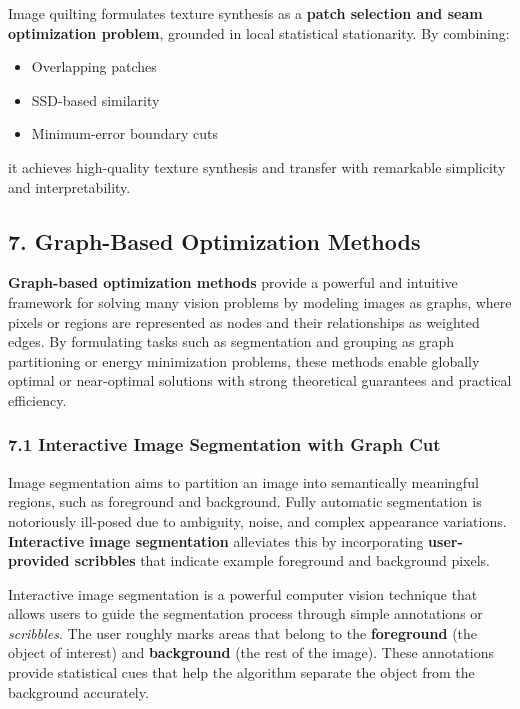 \documentclass[11pt]{article}
\providecommand{\tightlist}{%
      \setlength{\itemsep}{0pt}\setlength{\parskip}{0pt}}
\begin{document}
    Image quilting formulates texture synthesis as a \textbf{patch selection
and seam optimization problem}, grounded in local statistical
stationarity. By combining:

\begin{itemize}
\tightlist
\item
  Overlapping patches
\item
  SSD-based similarity
\item
  Minimum-error boundary cuts
\end{itemize}

it achieves high-quality texture synthesis and transfer with remarkable
simplicity and interpretability.

    \hypertarget{graph-based-optimization-methods}{%
\subsection{\texorpdfstring{\textbf{7. Graph-Based Optimization
Methods}}{7. Graph-Based Optimization Methods}}\label{graph-based-optimization-methods}}

\textbf{Graph-based optimization methods} provide a powerful and
intuitive framework for solving many vision problems by modeling images
as graphs, where pixels or regions are represented as nodes and their
relationships as weighted edges. By formulating tasks such as
segmentation and grouping as graph partitioning or energy minimization
problems, these methods enable globally optimal or near-optimal
solutions with strong theoretical guarantees and practical efficiency.

\hypertarget{interactive-image-segmentation-with-graph-cut}{%
\subsubsection{\texorpdfstring{\textbf{7.1 Interactive Image
Segmentation with Graph
Cut}}{7.1 Interactive Image Segmentation with Graph Cut}}\label{interactive-image-segmentation-with-graph-cut}}

Image segmentation aims to partition an image into semantically
meaningful regions, such as foreground and background. Fully automatic
segmentation is notoriously ill-posed due to ambiguity, noise, and
complex appearance variations. \textbf{Interactive image segmentation}
alleviates this by incorporating \textbf{user-provided scribbles} that
indicate example foreground and background pixels.

Interactive image segmentation is a powerful computer vision technique
that allows users to guide the segmentation process through simple
annotations or \emph{scribbles}. The user roughly marks areas that
belong to the \textbf{foreground} (the object of interest) and
\textbf{background} (the rest of the image). These annotations provide
statistical cues that help the algorithm separate the object from the
background accurately.
\end{document}

